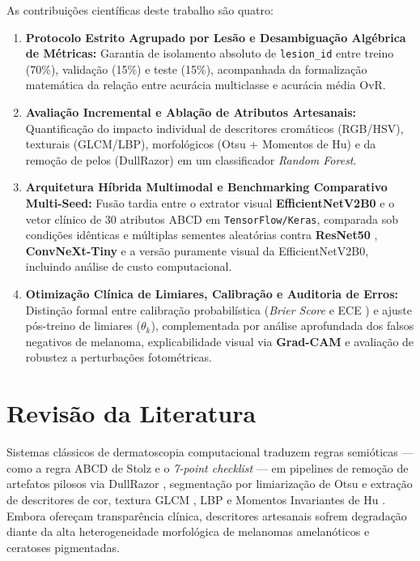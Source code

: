 \documentclass[12pt,a4paper]{article}
\begin{document}
As contribuições científicas deste trabalho são quatro:
\begin{enumerate}
    \item \textbf{Protocolo Estrito Agrupado por Lesão e Desambiguação Algébrica de Métricas:} Garantia de isolamento absoluto de \texttt{lesion\_id} entre treino (70\%), validação (15\%) e teste (15\%), acompanhada da formalização matemática da relação entre acurácia multiclasse e acurácia média OvR.
    \item \textbf{Avaliação Incremental e Ablação de Atributos Artesanais:} Quantificação do impacto individual de descritores cromáticos (RGB/HSV), texturais (GLCM/LBP), morfológicos (Otsu + Momentos de Hu) e da remoção de pelos (DullRazor) em um classificador \textit{Random Forest}.
    \item \textbf{Arquitetura Híbrida Multimodal e Benchmarking Comparativo Multi-Seed:} Fusão tardia entre o extrator visual \textbf{EfficientNetV2B0} \cite{tan2021} e o vetor clínico de 30 atributos ABCD em \texttt{TensorFlow/Keras}, comparada sob condições idênticas e múltiplas sementes aleatórias contra \textbf{ResNet50} \cite{he2016}, \textbf{ConvNeXt-Tiny} \cite{liu2022} e a versão puramente visual da EfficientNetV2B0, incluindo análise de custo computacional.
    \item \textbf{Otimização Clínica de Limiares, Calibração e Auditoria de Erros:} Distinção formal entre calibração probabilística (\textit{Brier Score} e ECE \cite{guo2017}) e ajuste pós-treino de limiares ($\theta_k$), complementada por análise aprofundada dos falsos negativos de melanoma, explicabilidade visual via \textbf{Grad-CAM} \cite{selvaraju2017} e avaliação de robustez a perturbações fotométricas.
\end{enumerate}

\section{Revisão da Literatura}
Sistemas clássicos de dermatoscopia computacional traduzem regras semióticas --- como a regra ABCD de Stolz \cite{nachbar1994} e o \textit{7-point checklist} \cite{argenziano1998} --- em pipelines de remoção de artefatos pilosos via DullRazor \cite{lee1997}, segmentação por limiarização de Otsu \cite{otsu1979} e extração de descritores de cor, textura GLCM \cite{haralick1973}, LBP \cite{ojala2002} e Momentos Invariantes de Hu \cite{hu1962} \cite{celebi2007, barata2014, barata2018}. Embora ofereçam transparência clínica, descritores artesanais sofrem degradação diante da alta heterogeneidade morfológica de melanomas amelanóticos e ceratoses pigmentadas.
\end{document}
